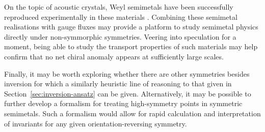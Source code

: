 On the topic of acoustic crystals, Weyl semimetals have been successfully reproduced experimentally in these materials \cite{Xiao_acoustic-Weyl,Hao_acoustic-Weyl,Wang_acoustic-Weyl,Xiao_acoustic-semimetal}. Combining these semimetal realisations with gauge fluxes may provide a platform to study semimetal physics directly under non-symmorphic symmetries. Veering into speculation for a moment, being able to study the transport properties of such materials may help confirm that no net chiral anomaly appears at sufficiently large scales.

Finally, it may be worth exploring whether there are other symmetries besides inversion for which a similarly heuristic line of reasoning to that given in Section~\ref{sec:inversion-ansatz} can be given. Alternatively, it may be possible to further develop a formalism for treating high-symmetry points in symmetric semimetals. Such a formalism would allow for rapid calculation and interpretation of invariants for any given orientation-reversing symmetry.